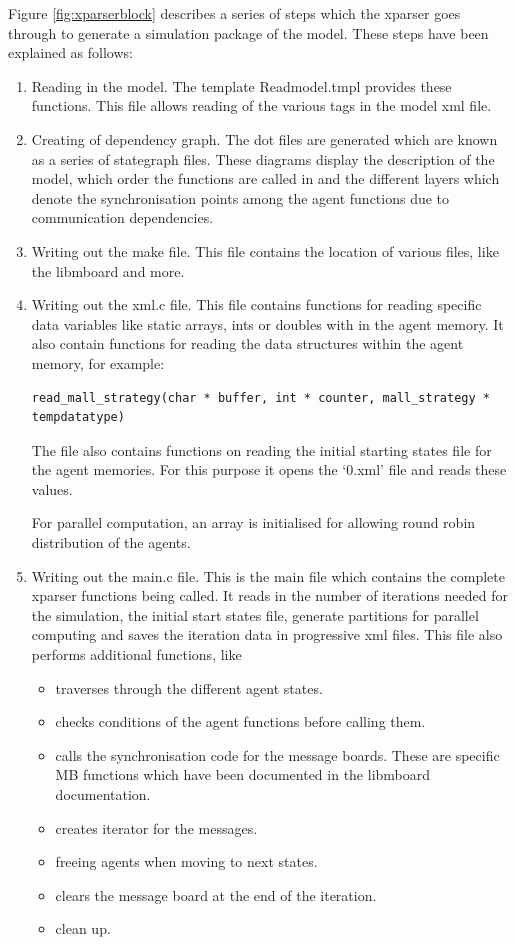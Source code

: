 Figure \ref{fig:xparserblock} describes a series of steps which the
xparser goes through to generate a simulation package of the model.
These steps have been explained as follows:
\begin{enumerate}
\item Reading in the model. The template Readmodel.tmpl provides these functions. This file allows reading
of the various tags in the model xml file.
\item Creating of dependency graph. The dot files are generated which are known as a series of stategraph files.
These diagrams display the description of the model, which order the functions are called in and the different
layers which denote the synchronisation points among the agent functions due to communication dependencies.
\item Writing out the make file. This file contains the location of various files, like the libmboard and more.
\item Writing out the xml.c file. This file contains functions for reading specific data variables like static
arrays, ints or doubles with in the agent memory. It also contain functions for reading the data structures
within the agent memory, for example:

\begin{mylisting}
\begin{verbatim}
read_mall_strategy(char * buffer, int * counter, mall_strategy * tempdatatype)
\end{verbatim}
\end{mylisting}

The file also contains functions on reading the initial starting states file for the agent memories.
For this purpose it opens the `0.xml' file and reads these values.

For parallel computation, an array is initialised for allowing round robin distribution of the agents.

\item Writing out the main.c file. This is the main file which contains the complete xparser functions
being called. It reads in the number of iterations needed for the simulation, the initial start states file, generate partitions for parallel computing and saves the iteration data in progressive xml files. This file also performs additional functions, like

\begin{itemize}
\item traverses through the different agent states.
\item checks conditions of the agent functions before calling them.
\item calls the synchronisation code for the message boards. These are specific MB functions which have been documented in the libmboard documentation.
\item creates iterator for the messages.
\item freeing agents when moving to next states.
\item clears the message board at the end of the iteration.
\item clean up.
\end{itemize}


\end{enumerate}
